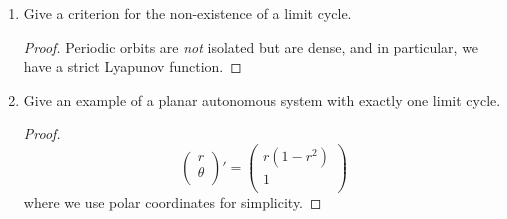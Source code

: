 \documentclass[../psets.tex]{subfiles}
\begin{document}
\begin{enumerate}
\begin{proof}
    \end{proof}
    \item Give a criterion for the non-existence of a limit cycle.
    \begin{proof}
        Periodic orbits are \emph{not} isolated but are dense, and in particular, we have a strict Lyapunov function.
    \end{proof}
    \item Give an example of a planar autonomous system with exactly one limit cycle.
    \begin{proof}
        \begin{equation*}
            \begin{pmatrix}
                r\\
                \theta\\
            \end{pmatrix}'
            =
            \begin{pmatrix}
                r(1-r^2)\\
                1\\
            \end{pmatrix}
        \end{equation*}
        where we use polar coordinates for simplicity.
    \end{proof}
\end{enumerate}
\end{document}
